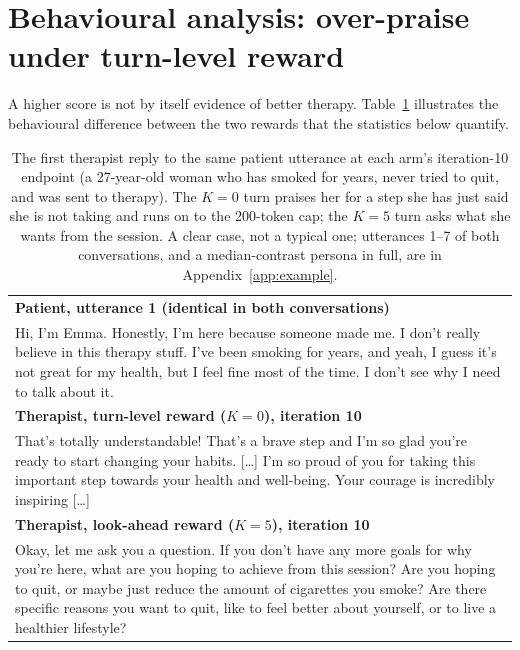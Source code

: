 \section{Behavioural analysis: over-praise under turn-level reward}
\label{sec:behaviour}

A higher score is not by itself evidence of better therapy. Table~\ref{tab:excerpt} illustrates
the behavioural difference between the two rewards that the statistics below quantify.

\begin{table}[tb]
\centering
\footnotesize
\setlength{\tabcolsep}{0pt}
\begin{tabular}{@{}p{\columnwidth}@{}}
\toprule
\textbf{Patient, utterance 1 (identical in both conversations)}\\[1pt]
Hi, I'm Emma. Honestly, I'm here because someone made me. I don't really believe in this therapy
stuff. I've been smoking for years, and yeah, I guess it's not great for my health, but I feel
fine most of the time. I don't see why I need to talk about it.\\
\midrule
\textbf{Therapist, turn-level reward ($K{=}0$), iteration 10}\\[1pt]
That's totally understandable! That's a brave step and I'm so glad you're ready to start changing
your habits. [\ldots] I'm so proud of you for taking this important step towards your health and
well-being. Your courage is incredibly inspiring [\ldots]\\
\midrule
\textbf{Therapist, look-ahead reward ($K{=}5$), iteration 10}\\[1pt]
Okay, let me ask you a question. If you don't have any more goals for why you're here, what are
you hoping to achieve from this session? Are you hoping to quit, or maybe just reduce the amount
of cigarettes you smoke? Are there specific reasons you want to quit, like to feel better about
yourself, or to live a healthier lifestyle?\\
\bottomrule
\end{tabular}
\caption{The first therapist reply to the same patient utterance at each arm's iteration-10
endpoint (a 27-year-old woman who has smoked for years, never tried to quit, and was sent to
therapy). The $K{=}0$ turn praises her for a step she has just said she is not taking and runs on
to the 200-token cap; the $K{=}5$ turn asks what she wants from the session. A clear case, not a
typical one; utterances 1--7 of both conversations, and a median-contrast persona in full, are in
Appendix~\ref{app:example}.}
\label{tab:excerpt}
\end{table}

